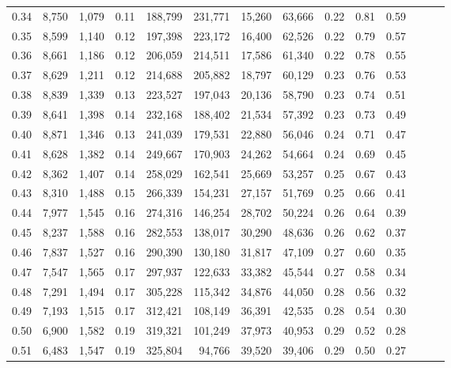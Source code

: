 \begin{tabular}{rrrrrrrrrrrrrr}
0.34 &   8,750 &  1,079 &  0.11 &  188,799 &  231,771 &  15,260 &  63,666 &  0.22 &  0.81 &      0.59 \\
0.35 &   8,599 &  1,140 &  0.12 &  197,398 &  223,172 &  16,400 &  62,526 &  0.22 &  0.79 &      0.57 \\
0.36 &   8,661 &  1,186 &  0.12 &  206,059 &  214,511 &  17,586 &  61,340 &  0.22 &  0.78 &      0.55 \\
0.37 &   8,629 &  1,211 &  0.12 &  214,688 &  205,882 &  18,797 &  60,129 &  0.23 &  0.76 &      0.53 \\
0.38 &   8,839 &  1,339 &  0.13 &  223,527 &  197,043 &  20,136 &  58,790 &  0.23 &  0.74 &      0.51 \\
0.39 &   8,641 &  1,398 &  0.14 &  232,168 &  188,402 &  21,534 &  57,392 &  0.23 &  0.73 &      0.49 \\
0.40 &   8,871 &  1,346 &  0.13 &  241,039 &  179,531 &  22,880 &  56,046 &  0.24 &  0.71 &      0.47 \\
0.41 &   8,628 &  1,382 &  0.14 &  249,667 &  170,903 &  24,262 &  54,664 &  0.24 &  0.69 &      0.45 \\
0.42 &   8,362 &  1,407 &  0.14 &  258,029 &  162,541 &  25,669 &  53,257 &  0.25 &  0.67 &      0.43 \\
0.43 &   8,310 &  1,488 &  0.15 &  266,339 &  154,231 &  27,157 &  51,769 &  0.25 &  0.66 &      0.41 \\
0.44 &   7,977 &  1,545 &  0.16 &  274,316 &  146,254 &  28,702 &  50,224 &  0.26 &  0.64 &      0.39 \\
0.45 &   8,237 &  1,588 &  0.16 &  282,553 &  138,017 &  30,290 &  48,636 &  0.26 &  0.62 &      0.37 \\
0.46 &   7,837 &  1,527 &  0.16 &  290,390 &  130,180 &  31,817 &  47,109 &  0.27 &  0.60 &      0.35 \\
0.47 &   7,547 &  1,565 &  0.17 &  297,937 &  122,633 &  33,382 &  45,544 &  0.27 &  0.58 &      0.34 \\
0.48 &   7,291 &  1,494 &  0.17 &  305,228 &  115,342 &  34,876 &  44,050 &  0.28 &  0.56 &      0.32 \\
0.49 &   7,193 &  1,515 &  0.17 &  312,421 &  108,149 &  36,391 &  42,535 &  0.28 &  0.54 &      0.30 \\
0.50 &   6,900 &  1,582 &  0.19 &  319,321 &  101,249 &  37,973 &  40,953 &  0.29 &  0.52 &      0.28 \\
0.51 &   6,483 &  1,547 &  0.19 &  325,804 &   94,766 &  39,520 &  39,406 &  0.29 &  0.50 &      0.27 \\

\end{tabular}
